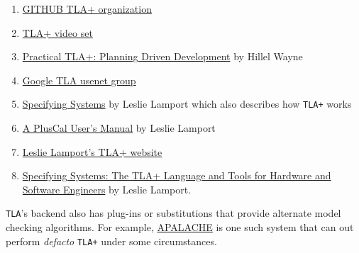 \documentclass[twocolumn]{article}
\begin{document}
\begin{enumerate}
\item \href{https://github.com/tlaplus}{GITHUB TLA+ organization}
\item \href{https://lamport.azurewebsites.net/video/videos.html}{TLA+ video set}
\item \href{https://www.apress.com/gp/book/9781484238288}{Practical TLA+: Planning Driven Development} by Hillel Wayne
\item \href{https://groups.google.com/g/tlaplus}{Google TLA usenet group}
\item \href{https://lamport.azurewebsites.net/tla/book-02-08-08.pdf}{Specifying Systems} by Leslie Lamport which also describes how \texttt{TLA+} works
\item \href{https://lamport.azurewebsites.net/tla/p-manual.pdf}{A PlusCal User’s Manual} by Leslie Lamport
\item \href{https://lamport.azurewebsites.net/}{Leslie Lamport's TLA+ website}
\item \href{https://tinyurl.com/y5jef4bk}{Specifying Systems: The TLA+ Language and Tools for Hardware and Software Engineers} by Leslie Lamport.
\end{enumerate}

\texttt{TLA}'s backend also has plug-ins or substitutions that provide alternate model checking algorithms. For example, \href{https://blog.acolyer.org/2019/11/29/tla-model-checking-made-symbolic/}{APALACHE} is one such system that can out perform \emph{defacto} \texttt{TLA+} under some circumstances.


\end{document}

